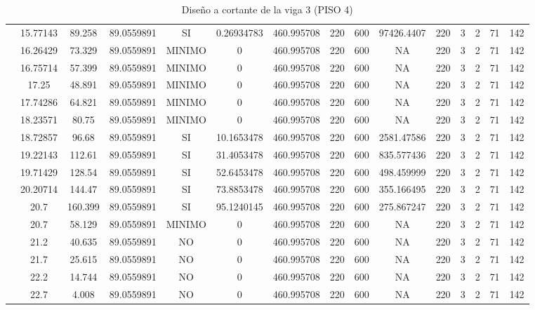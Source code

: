 \begin{table}[H]
{\begin{tabular}{|c|c|c|c|c|c|c|c|c|c|c|c|c|c|c|}
\cline{2-15}    & 15.77143 & 89.258 & 89.0559891 & SI  & 0.26934783 & 460.995708 & 220 & 600 & 97426.4407 & 220 & 3   & 2   & 71  & 142 \bigstrut\\
\cline{2-15}    & 16.26429 & 73.329 & 89.0559891 & MINIMO & 0   & 460.995708 & 220 & 600 & NA  & 220 & 3   & 2   & 71  & 142 \bigstrut\\
\cline{2-15}    & 16.75714 & 57.399 & 89.0559891 & MINIMO & 0   & 460.995708 & 220 & 600 & NA  & 220 & 3   & 2   & 71  & 142 \bigstrut\\
\cline{2-15}    & 17.25 & 48.891 & 89.0559891 & MINIMO & 0   & 460.995708 & 220 & 600 & NA  & 220 & 3   & 2   & 71  & 142 \bigstrut\\
\cline{2-15}    & 17.74286 & 64.821 & 89.0559891 & MINIMO & 0   & 460.995708 & 220 & 600 & NA  & 220 & 3   & 2   & 71  & 142 \bigstrut\\
\cline{2-15}    & 18.23571 & 80.75 & 89.0559891 & MINIMO & 0   & 460.995708 & 220 & 600 & NA  & 220 & 3   & 2   & 71  & 142 \bigstrut\\
\cline{2-15}    & 18.72857 & 96.68 & 89.0559891 & SI  & 10.1653478 & 460.995708 & 220 & 600 & 2581.47586 & 220 & 3   & 2   & 71  & 142 \bigstrut\\
\cline{2-15}    & 19.22143 & 112.61 & 89.0559891 & SI  & 31.4053478 & 460.995708 & 220 & 600 & 835.577436 & 220 & 3   & 2   & 71  & 142 \bigstrut\\
\cline{2-15}    & 19.71429 & 128.54 & 89.0559891 & SI  & 52.6453478 & 460.995708 & 220 & 600 & 498.459999 & 220 & 3   & 2   & 71  & 142 \bigstrut\\
\cline{2-15}    & 20.20714 & 144.47 & 89.0559891 & SI  & 73.8853478 & 460.995708 & 220 & 600 & 355.166495 & 220 & 3   & 2   & 71  & 142 \bigstrut\\
\cline{2-15}    & 20.7 & 160.399 & 89.0559891 & SI  & 95.1240145 & 460.995708 & 220 & 600 & 275.867247 & 220 & 3   & 2   & 71  & 142 \bigstrut\\
\cline{2-15}    & 20.7 & 58.129 & 89.0559891 & MINIMO & 0   & 460.995708 & 220 & 600 & NA  & 220 & 3   & 2   & 71  & 142 \bigstrut\\
\cline{2-15}    & 21.2 & 40.635 & 89.0559891 & NO  & 0   & 460.995708 & 220 & 600 & NA  & 220 & 3   & 2   & 71  & 142 \bigstrut\\
\cline{2-15}    & 21.7 & 25.615 & 89.0559891 & NO  & 0   & 460.995708 & 220 & 600 & NA  & 220 & 3   & 2   & 71  & 142 \bigstrut\\
\cline{2-15}    & 22.2 & 14.744 & 89.0559891 & NO  & 0   & 460.995708 & 220 & 600 & NA  & 220 & 3   & 2   & 71  & 142 \bigstrut\\
\cline{2-15}    & 22.7 & 4.008 & 89.0559891 & NO  & 0   & 460.995708 & 220 & 600 & NA  & 220 & 3   & 2   & 71  & 142 \bigstrut\\
\hline
\end{tabular}%

  
 
  }%
    \caption{Diseño a cortante de la viga 3 (PISO 4) }
  \label{tab:C VG3 P4 }%
\end{table}%
